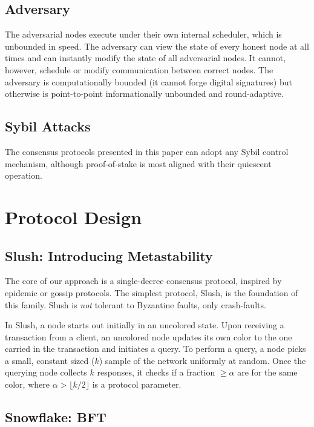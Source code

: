 \documentclass[11pt]{article}
\begin{document}
\subsection{Adversary}

The adversarial nodes execute under their own
internal scheduler, which is unbounded in speed. The adversary can
view the state of every honest node at all times and can
instantly modify the state of all adversarial nodes. It cannot,
however, schedule or modify communication between correct
nodes. The adversary is computationally
bounded (it cannot forge digital signatures) but otherwise is
point-to-point informationally unbounded and round-adaptive.

\subsection{Sybil Attacks}

The consensus protocols presented in this
paper can adopt any Sybil control mechanism, although proof-of-stake is most aligned with their quiescent operation.

\section{Protocol Design}\label{sec:design}

\subsection{Slush: Introducing Metastability}

The core of our approach is a single-decree consensus protocol,
inspired by epidemic or gossip protocols. The simplest protocol, Slush, is the foundation of this family.
Slush is \emph{not} tolerant to Byzantine faults, only crash-faults.

In Slush, a node starts out initially in an uncolored state.
Upon receiving a transaction from a client, an uncolored node
updates its own color to the one carried in the transaction
and initiates a query. To perform a query, a node picks a
small, constant sized ($k$) sample of the network uniformly at
random. Once the querying
node collects $k$ responses, it checks if a fraction $\geq \alpha$ are for
the same color, where $\alpha > \lfloor k/2 \rfloor$ is a protocol parameter.

\subsection{Snowflake: BFT}
\end{document}
